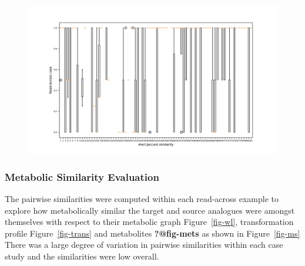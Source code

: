 \documentclass[
  super,
  preprint,
  3p]{elsarticle}
\begin{document}
\begin{figure}

\begin{minipage}{0.50\linewidth}

\includegraphics{Alert_similarity.png}

\end{minipage}%

\end{figure}%

\subsubsection{Metabolic Similarity
Evaluation}\label{metabolic-similarity-evaluation}

The pairwise similarities were computed within each read-across example
to explore how metabolically similar the target and source analogues
were amongst themselves with respect to their metabolic graph
Figure~\ref{fig-wl}, transformation profile Figure~\ref{fig-trans} and
metabolites \textbf{?@fig-mets} as shown in Figure~\ref{fig-ms} There
was a large degree of variation in pairwise similarities within each
case study and the similarities were low overall.
\end{document}
